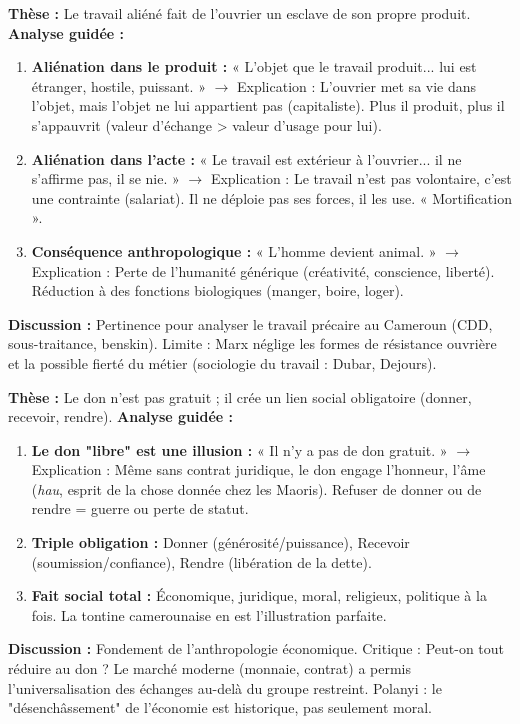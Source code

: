 \documentclass[11pt]{article}
\begin{document}
\begin{exemplebox}
\textbf{Thèse :} Le travail aliéné fait de l'ouvrier un esclave de son propre produit.
\textbf{Analyse guidée :}
\begin{enumerate}
    \item \textbf{Aliénation dans le produit :} « L'objet que le travail produit... lui est étranger, hostile, puissant. » $\rightarrow$ Explication : L'ouvrier met sa vie dans l'objet, mais l'objet ne lui appartient pas (capitaliste). Plus il produit, plus il s'appauvrit (valeur d'échange > valeur d'usage pour lui).
    \item \textbf{Aliénation dans l'acte :} « Le travail est extérieur à l'ouvrier... il ne s'affirme pas, il se nie. » $\rightarrow$ Explication : Le travail n'est pas volontaire, c'est une contrainte (salariat). Il ne déploie pas ses forces, il les use. « Mortification ».
    \item \textbf{Conséquence anthropologique :} « L'homme devient animal. » $\rightarrow$ Explication : Perte de l'humanité générique (créativité, conscience, liberté). Réduction à des fonctions biologiques (manger, boire, loger).
\end{enumerate}
\textbf{Discussion :} Pertinence pour analyser le travail précaire au Cameroun (CDD, sous-traitance, benskin). Limite : Marx néglige les formes de résistance ouvrière et la possible fierté du métier (sociologie du travail : Dubar, Dejours).
\end{exemplebox}

\begin{exemplebox}
\textbf{Thèse :} Le don n'est pas gratuit ; il crée un lien social obligatoire (donner, recevoir, rendre).
\textbf{Analyse guidée :}
\begin{enumerate}
    \item \textbf{Le don "libre" est une illusion :} « Il n'y a pas de don gratuit. » $\rightarrow$ Explication : Même sans contrat juridique, le don engage l'honneur, l'âme (\emph{hau}, esprit de la chose donnée chez les Maoris). Refuser de donner ou de rendre = guerre ou perte de statut.
    \item \textbf{Triple obligation :} Donner (générosité/puissance), Recevoir (soumission/confiance), Rendre (libération de la dette).
    \item \textbf{Fait social total :} Économique, juridique, moral, religieux, politique à la fois. La tontine camerounaise en est l'illustration parfaite.
\end{enumerate}
\textbf{Discussion :} Fondement de l'anthropologie économique. Critique : Peut-on tout réduire au don ? Le marché moderne (monnaie, contrat) a permis l'universalisation des échanges au-delà du groupe restreint. Polanyi : le "désenchâssement" de l'économie est historique, pas seulement moral.
\end{exemplebox}
\end{document}
